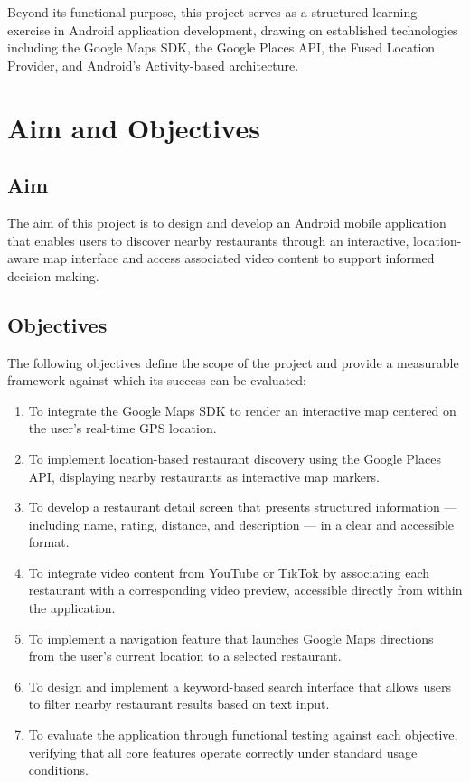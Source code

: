 \documentclass[12pt, a4paper]{article}
\begin{document}
Beyond its functional purpose, this project serves as a structured learning exercise in Android application development, drawing on established technologies including the Google Maps SDK, the Google Places API, the Fused Location Provider, and Android's Activity-based architecture.

\section{Aim and Objectives}

\subsection*{Aim}

The aim of this project is to design and develop an Android mobile application that enables users to discover nearby restaurants through an interactive, location-aware map interface and access associated video content to support informed decision-making.

\subsection*{Objectives}

The following objectives define the scope of the project and provide a measurable framework against which its success can be evaluated:

\begin{enumerate}
    \item To integrate the Google Maps SDK to render an interactive map centered on the user's real-time GPS location.

    \item To implement location-based restaurant discovery using the Google Places API, displaying nearby restaurants as interactive map markers.

    \item To develop a restaurant detail screen that presents structured information — including name, rating, distance, and description — in a clear and accessible format.

    \item To integrate video content from YouTube or TikTok by associating each restaurant with a corresponding video preview, accessible directly from within the application.

    \item To implement a navigation feature that launches Google Maps directions from the user's current location to a selected restaurant.

    \item To design and implement a keyword-based search interface that allows users to filter nearby restaurant results based on text input.

    \item To evaluate the application through functional testing against each objective, verifying that all core features operate correctly under standard usage conditions.
\end{enumerate}
\end{document}
